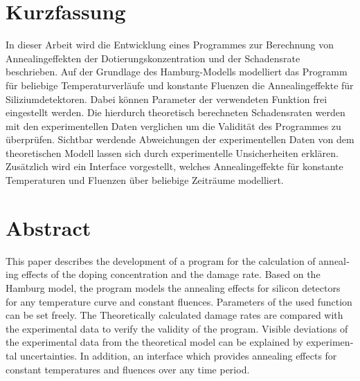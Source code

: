 \thispagestyle{plain}

\section*{Kurzfassung}
In dieser Arbeit wird die Entwicklung eines Programmes zur
Berechnung von Annealingeffekten der Dotierungskonzentration und der Schadensrate
beschrieben. Auf der Grundlage des Hamburg-Modells modelliert das Programm für beliebige
Temperaturverläufe und konstante Fluenzen die Annealingeffekte für Siliziumdetektoren.
Dabei können Parameter der verwendeten Funktion frei eingestellt werden.
Die hierdurch theoretisch berechneten Schadensraten werden mit den experimentellen Daten verglichen
um die Validität des Programmes zu überprüfen. Sichtbar werdende Abweichungen der
experimentellen Daten von dem theoretischen Modell lassen sich durch experimentelle Unsicherheiten erklären.
Zusätzlich wird ein Interface vorgestellt, welches Annealingeffekte für konstante Temperaturen und Fluenzen
über beliebige Zeiträume modelliert.

\section*{Abstract}
\begin{english}
  This paper describes the development of a program for the calculation of annealing effects of the doping concentration and the damage rate.
  Based on the Hamburg model, the program models the annealing effects for silicon detectors for any temperature curve and constant fluences.
  Parameters of the used function can be set freely. The
  Theoretically calculated damage rates are compared with the experimental data to verify the validity of the program. Visible deviations of the experimental data from the theoretical model can be explained by experimental uncertainties. In addition, an interface which provides annealing effects for constant temperatures and fluences over any time period.



\end{english}
